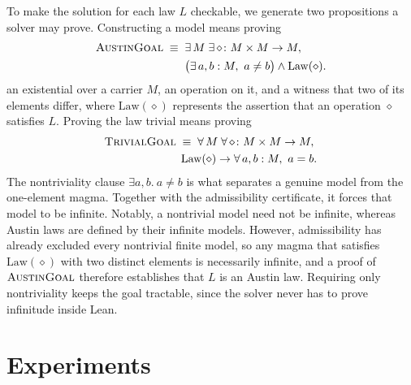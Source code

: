 \documentclass[letterpaper]{article} %
\newcommand{\op}{\diamond}
\begin{document}
To make the solution for each law $L$ checkable, we generate two
propositions a solver may prove. Constructing a model means proving
\[
  \begin{aligned}
    \textsc{AustinGoal} \;\equiv\;{}& \exists\, M\; \exists\, {\op}\colon M \times M \to M,\\
    & \bigl(\exists\, a, b : M,\ a \neq b\bigr) \wedge \mathrm{Law}(\op).
  \end{aligned}
\]
 an existential over a carrier $M$, an operation on it, and a witness that two of its elements differ, where $\mathrm{Law}(\op)$ represents the assertion that an operation $\op$ satisfies $L$. Proving the law trivial means proving
\[
\begin{aligned}
      \textsc{TrivialGoal} \;\equiv\; \forall\, M\; \forall\, {\op}\colon M \times M \to M,\; \\
  \mathrm{Law}(\op) \rightarrow \forall\, a, b : M,\ a = b.
\end{aligned}
\]
The nontriviality clause $\exists a, b.\ a \neq b$ is what separates a genuine model from the one-element magma. Together with the admissibility certificate, it forces that
model to be infinite. Notably, a nontrivial model need not be infinite, whereas Austin laws are defined by their infinite models. However, admissibility has already excluded every nontrivial finite model, so any magma that satisfies $\mathrm{Law}(\op)$ with two distinct elements is necessarily infinite, and a proof of $\textsc{AustinGoal}$ therefore establishes that $L$ is an Austin law. Requiring only nontriviality keeps the goal tractable, since the solver never has to prove infinitude inside Lean.






\section{Experiments}
\end{document}
